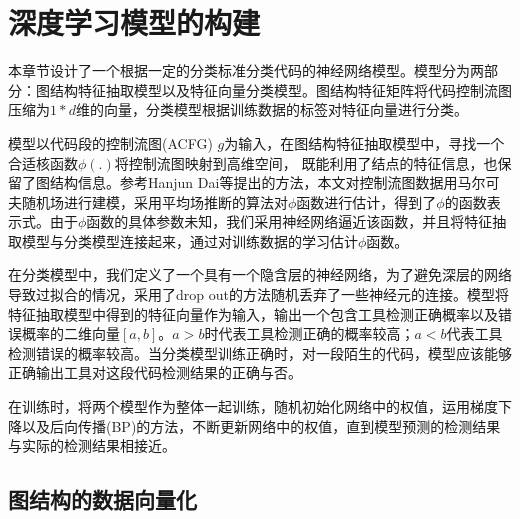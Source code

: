 \chapter{深度学习模型的构建}
本章节设计了一个根据一定的分类标准分类代码的神经网络模型。模型分为两部分：图结构特征抽取模型以及特征向量分类模型。图结构特征矩阵将代码控制流图压缩为$1*d$维的向量，分类模型根据训练数据的标签对特征向量进行分类。
\par 模型以代码段的控制流图(ACFG) $g$为输入，在图结构特征抽取模型中，寻找一个合适核函数$\phi(.)$将控制流图映射到高维空间， 既能利用了结点的特征信息，也保留了图结构信息。参考Hanjun Dai\cite{dai2016discriminative}等提出的方法，本文对控制流图数据用马尔可夫随机场进行建模，采用平均场推断的算法对$\phi$函数进行估计，得到了$\phi$的函数表示式。由于$\phi$函数的具体参数未知，我们采用神经网络逼近该函数，并且将特征抽取模型与分类模型连接起来，通过对训练数据的学习估计$\phi$函数。
\par 在分类模型中，我们定义了一个具有一个隐含层的神经网络，为了避免深层的网络导致过拟合的情况，采用了drop out的方法随机丢弃了一些神经元的连接。模型将特征抽取模型中得到的特征向量作为输入，输出一个包含工具检测正确概率以及错误概率的二维向量$[a, b]$。$a>b$时代表工具检测正确的概率较高；$a<b$代表工具检测错误的概率较高。当分类模型训练正确时，对一段陌生的代码，模型应该能够正确输出工具对这段代码检测结果的正确与否。
\par 在训练时，将两个模型作为整体一起训练，随机初始化网络中的权值，运用梯度下降以及后向传播(BP)的方法，不断更新网络中的权值，直到模型预测的检测结果与实际的检测结果相接近。
\label{chap:deeplearning}
\section{图结构的数据向量化}
